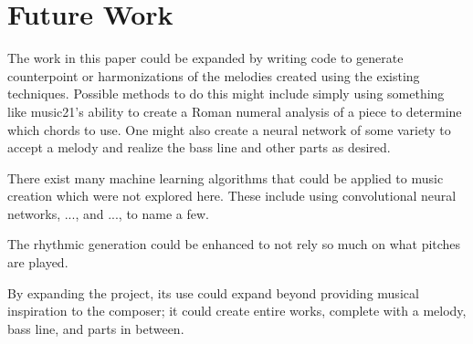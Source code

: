 \section{Future Work} \label{future}

The work in this paper could be expanded by writing code to generate counterpoint or harmonizations of the melodies created using the existing techniques.
Possible methods to do this might include simply using something like music21's ability to create a Roman numeral analysis of a piece to determine which chords to use.
One might also create a neural network of some variety to accept a melody and realize the bass line and other parts as desired.

There exist many machine learning algorithms that could be applied to music creation which were not explored here.
These include using convolutional neural networks, ..., and ..., to name a few.

The rhythmic generation could be enhanced to not rely so much on what pitches are played.

By expanding the project, its use could expand beyond providing musical inspiration to the composer; it could create entire works, complete with a melody, bass line, and parts in between.
